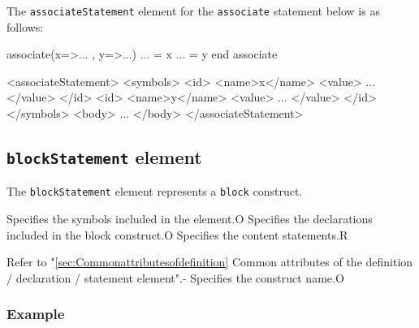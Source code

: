 The {\tt associateStatement} element for the {\tt associate} statement below is as follows:
\vspace{2mm}

\begin{Fexample2008}
associate(x=>... , y=>...)
 ... = x
 ... = y
end associate
\end{Fexample2008}
\vspace{1mm}

\begin{XcodeMLFExample}
<associateStatement>
  <symbols>
    <id>
      <name>x</name>
      <value>
        ...
      </value>
    </id>
    <id>
      <name>y</name>
      <value>
        ...
      </value>
    </id>
  </symbols>
  <body>
     ...
  </body>
</associateStatement>
\end{XcodeMLFExample}


\subsection{ {\tt blockStatement} element}

The {\tt blockStatement} element represents a {\tt block} construct.


\begin{XcodeMLChildElements}
{Specifies the symbols included in the element.}{O}
{Specifies the declarations included in the block construct.}{O}
{Specifies the content statements.}{R}
\end{XcodeMLChildElements}

\begin{XcodeMLAttributes}
{Refer to "\ref{sec:Commonattributesofdefinition} Common attributes of the definition / declaration / statement element".}{-}
{Specifies the construct name.}{O}
\end{XcodeMLAttributes}

\subsubsection*{Example}


